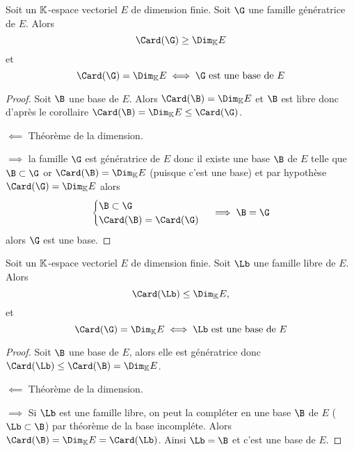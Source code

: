 \begin{theo}
  Soit un $\mathbb{K}$-espace vectoriel $E$ de dimension finie. Soit $\G$ une famille génératrice de $E$. Alors
  \begin{equation}
    \Card(\G) \geq \Dim_\K E
  \end{equation}
et
\begin{equation}
  \Card(\G)=\Dim_\K E \iff \G \text{~est une base de } E
\end{equation}
\end{theo}
\begin{proof}
  Soit $\B$ une base de $E$. Alors $\Card(\B)=\Dim_\K E$ et $\B$ est libre donc d'après le corollaire $\Card(\B) = \Dim_\K E \leq \Card(\G)$.

  $\impliedby$ Théorème de la dimension.

  $\implies$ la famille $\G$ est génératrice de $E$ donc il existe une base $\B$ de $E$ telle que $\B \subset \G$ or $\Card(\B) = \Dim_\K E$ (puisque c'est une base) et par hypothèse $\Card(\G) = \Dim_\K E$ alors
  \begin{equation}
    \begin{cases} \B \subset \G \\ \Card(\B) = \Card(\G) \end{cases} \implies \B=\G
  \end{equation}
  alors $\G$ est une base.
\end{proof}

\begin{theo}
  Soit un $\mathbb{K}$-espace vectoriel $E$ de dimension finie. Soit $\Lb$ une famille libre de $E$. Alors
  \begin{equation}
    \Card(\Lb) \leq \Dim_\K E,
  \end{equation}
  et
  \begin{equation}
    \Card(\G)=\Dim_\K E \iff \Lb \text{~est une base de } E
  \end{equation}
\end{theo}
\begin{proof}
  Soit $\B$ une base de $E$, alors elle est génératrice donc $\Card(\Lb) \leq \Card(\B)=\Dim_\K E$.

  $\impliedby$ Théorème de la dimension.
  
  $\implies$ Si $\Lb$ est une famille libre, on peut la compléter en une base $\B$ de $E$ ($\Lb \subset \B$) par théorème de la base incompléte. Alors $\Card(\B)=\Dim_\K E = \Card(\Lb)$. Ainsi $\Lb=\B$ et c'est une base de $E$.
\end{proof}

